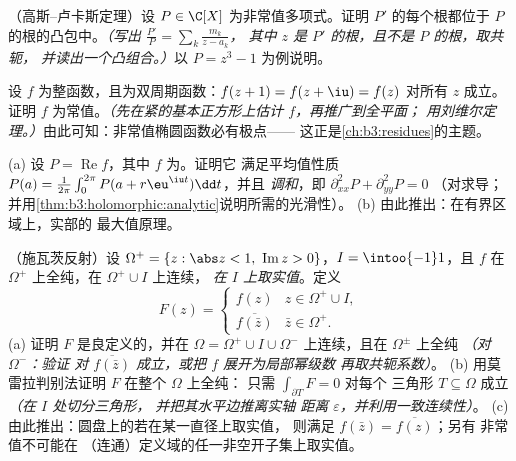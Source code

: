 \begin{exercise}[$\star\star\star$]\label{exo:b3:holomorphic:8}
（高斯–卢卡斯定理）设 $P \in \C[X]$ 为非常值多项式。证明
$P'$ 的每个根都位于
$P$ 的根的凸包中。\emph{（写出 $\frac{P'}{P} = \sum_k\frac{m_k}{z - a_k}$，
其中 $z$ 是 $P'$ 的根，且不是 $P$ 的根，取共轭，
并读出一个凸组合。）}以
$P = z^3 - 1$ 为例说明。
\end{exercise}

\begin{exercise}[$\star\star\star$]\label{exo:b3:holomorphic:9}
设 $f$ 为整函数，且为双周期函数：$f(z + 1) = f(z + \iu)
= f(z)$ 对所有 $z$ 成立。证明 $f$ 为常值。\emph{（先在紧的基本正方形上估计
$f$，再推广到全平面；
用刘维尔定理。）}由此可知：非常值椭圆函数必有极点——
这正是\cref{ch:b3:residues}的主题。
\end{exercise}

\begin{exercise}[$\star\star$]\label{exo:b3:holomorphic:10}
(a) 设 $P = \operatorname{Re}f$，其中 $f$ 为。证明它
满足平均值性质 $P(a) =
\frac1{2\pi}\int_0^{2\pi}P(a + r\eu^{\iu t})\dd t$，并且
\emph{调和}，即 $\partial^2_{xx}P + \partial^2_{yy}P = 0$
（对求导；
并用\cref{thm:b3:holomorphic:analytic}说明所需的光滑性）。
(b) 由此推出：在有界区域上，实部的
最大值原理。
\end{exercise}

\begin{exercise}[$\star\star\star$]\label{exo:b3:holomorphic:11}
（施瓦茨反射）设 $\Omega^+ = \{z : \abs z < 1,\
\operatorname{Im}z > 0\}$，$I = \intoo{-1}1$，且 $f$
在 $\Omega^+$ 上全纯，在 $\Omega^+\cup I$ 上连续，
\emph{在 $I$ 上取实值}。定义
\[
F(z) = \begin{cases} f(z) & z \in \Omega^+\cup I,\\
\overline{f(\bar z)} & \bar z \in \Omega^+ . \end{cases}
\]
(a) 证明 $F$ 是良定义的，并在
$\Omega = \Omega^+\cup I\cup\Omega^-$ 上连续，且在
$\Omega^\pm$ 上全纯 \emph{（对 $\Omega^-$：验证
对 $\overline{f(\bar z)}$ 成立，或把 $f$ 展开为局部幂级数
再取共轭系数）}。
(b) 用莫雷拉判别法证明 $F$ 在整个 $\Omega$ 上全纯：
只需 $\int_{\partial T}F = 0$ 对每个
三角形 $T \subseteq \Omega$ 成立 \emph{（在 $I$ 处切分三角形，
并把其水平边推离实轴
距离 $\varepsilon$，并利用一致连续性）}。
(c) 由此推出：圆盘上的若在某一直径上取实值，
则满足 $f(\bar z) = \overline{f(z)}$；另有
非常值不可能在
（连通）定义域的任一非空开子集上取实值。
\end{exercise}

